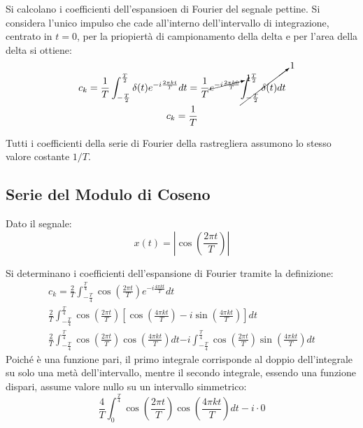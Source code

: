 \documentclass{article}
\numberwithin{equation}{subsection}
\begin{document}
Si calcolano i coefficienti dell'espansioen di Fourier del segnale pettine. Si considera l'unico impulso che cade all'interno dell'intervallo di integrazione, centrato 
in $t=0$, per la priopiertà di campionamento della delta e per l'area della delta si ottiene:
\begin{gather*}
    c_k=\displaystyle\frac{1}{T}\int_{-\frac{T}{2}}^{\frac{T}{2}}\delta(t)e^{-i\frac{2\pi kt}{T}}dt=\frac{1}{T}\cancelto{1}{e^{-i{\frac{2\pi k0}{T}}}}\cancelto{1}{\int_{-\frac{T}{2}}^{\frac{T}{2}}\delta(t)dt}\\
    c_k=\displaystyle\frac{1}{T}
\end{gather*}

Tutti i coefficienti della serie di Fourier della rastregliera assumono lo stesso valore costante $1/T$. 

\subsection{Serie del Modulo di Coseno}
Dato il segnale:
\begin{equation*}
    x(t)=\left|\cos\left(\displaystyle\frac{2\pi t}{T}\right)\right|
\end{equation*}

Si determinano i coefficienti dell'espansione di Fourier tramite la definizione:
\begin{gather*}
    c_k=\displaystyle\frac{2}{T}\int_{-\frac{T}{4}}^{\frac{T}{4}}\cos\left(\displaystyle\frac{2\pi t}{T}\right)e^{-i\frac{4\pi kt}{T}}dt\\
    \displaystyle\frac{2}{T}\int_{-\frac{T}{4}}^{\frac{T}{4}}\cos\left(\displaystyle\frac{2\pi t}{T}\right)\left[\cos\left(\frac{4\pi kt}{T}\right)-i\sin\left(\frac{4\pi kt}{T}\right)\right]dt\\
    \displaystyle\frac{2}{T}\int_{-\frac{T}{4}}^{\frac{T}{4}}\cos\left(\frac{2\pi t}{T}\right)\cos\left(\frac{4\pi kt}{T}\right)dt
    {-i\int_{-\frac{T}{4}}^{\frac{T}{4}}\cos\left(\frac{2\pi t}{T}\right)\sin\left(\frac{4\pi kt}{T}\right)dt}
\end{gather*}
Poiché è una funzione pari, il primo integrale corrisponde al doppio dell'integrale su solo una metà dell'intervallo, mentre il secondo integrale, essendo una funzione 
dispari, assume valore nullo su un intervallo simmetrico:
\begin{equation*}
    \displaystyle\frac{4}{T}\int_{0}^{\frac{T}{4}}\cos\left(\frac{2\pi t}{T}\right)\cos\left(\frac{4\pi kt}{T}\right)dt-i\cdot0
\end{equation*}
\end{document}
